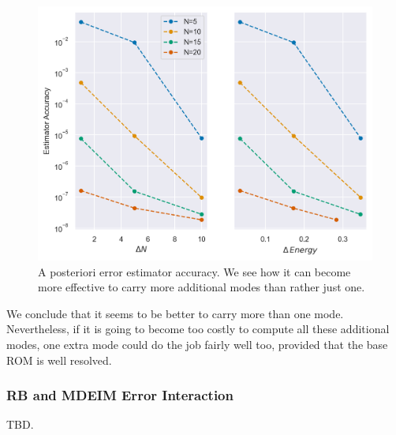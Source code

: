 \documentclass[../../thesis.tex]{subfiles}
\begin{document}
\begin{figure}[h]
    \centering
    \includegraphics[width=1\columnwidth]{research_project/piston/figures/rb_certification/estimator_accuracy.png}
    \caption{A posteriori error estimator accuracy.
    We see how it can become more effective to carry more additional modes than rather just one.}
    \label{fig:estimator_accuracy}
\end{figure}
We conclude that it seems to be better to carry more than one mode.
Nevertheless, if it is going to become too costly to compute all these additional modes,
one extra mode could do the job fairly well too, provided that the base ROM is well resolved.

\subsubsection{RB and MDEIM Error Interaction}
TBD. 
\end{document}

